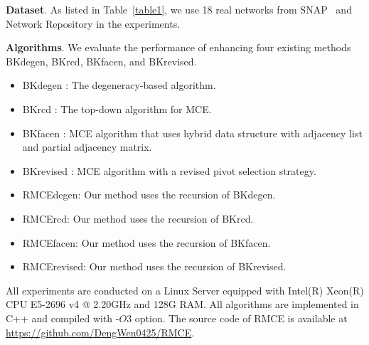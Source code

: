 \documentclass[sigconf, nonacm]{acmart}
\newcommand{\red}[1]{{\color{red}{#1}}}
\newcommand{\blue}[1]{{\color{blue}{#1}}}
\begin{document}
\noindent\textbf{Dataset}. As listed in Table~\ref{table1}, we use 18 real networks from SNAP~\cite{snapnets} and Network Repository \cite{rossi2015network} in the experiments. %

\noindent\textbf{Algorithms}. 
We evaluate the performance of enhancing four existing methods BKdegen, BKrcd, BKfacen, and BKrevised.
\begin{itemize}[leftmargin=0.35cm, itemindent=0cm]
    \item {BKdegen} \cite{eppstein2010listing}: The degeneracy-based algorithm.
    \item {BKrcd} \cite{li2019fast}: The top-down algorithm for MCE.
    \item {BKfacen} \cite{jin2022fast}: MCE algorithm that uses hybrid data structure with adjacency list and partial adjacency matrix.
    \item {BKrevised} \cite{naude2016refined}: MCE algorithm with a revised pivot selection strategy.
    \item {RMCEdegen}: 
     Our method uses the recursion of BKdegen.
    \item {RMCErcd}: 
     Our method uses the recursion of BKrcd.
     \item {RMCEfacen}: 
     Our method uses the recursion of BKfacen.
     \item  {RMCErevised}:
     Our method uses the recursion of BKrevised.
\end{itemize}


All experiments are conducted on a Linux Server equipped with
Intel(R) Xeon(R) CPU E5-2696 v4 @ 2.20GHz and 128G RAM. All
algorithms are implemented in C++ and compiled with -$O3$ option. The source code of RMCE is available at \url{https://github.com/DengWen0425/RMCE}.
\end{document}
